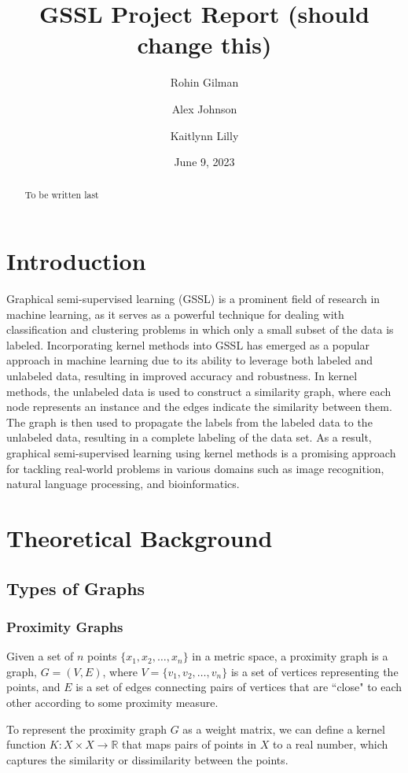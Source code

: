 \documentclass[12pt]{amsart}
\title{GSSL Project Report (should change this)}
\author{Rohin Gilman \and Alex Johnson \and Kaitlynn Lilly}
\date{June 9, 2023}
\begin{document}
\begin{abstract}
	To be written last
\end{abstract}

\maketitle

\section{Introduction} 
Graphical semi-supervised learning (GSSL) is a prominent field of research in machine learning, as it serves as a powerful technique for dealing with classification and clustering problems in which only a small subset of the data is labeled. Incorporating kernel methods into GSSL has emerged as a popular approach in machine learning due to its ability to leverage both labeled and unlabeled data, resulting in improved accuracy and robustness. In kernel methods, the unlabeled data is used to construct a similarity graph, where each node represents an instance and the edges indicate the similarity between them. The graph is then used to propagate the labels from the labeled data to the unlabeled data, resulting in a complete labeling of the data set. As a result, graphical semi-supervised learning using kernel methods is a promising approach for tackling real-world problems in various domains such as image recognition, natural language processing, and bioinformatics.

\section{Theoretical Background}

\subsection{Types of Graphs}
\subsubsection{Proximity Graphs}
Given a set of $n$ points $\{x_1, x_2, \dots, x_n\}$ in a metric space, a proximity graph is a graph, $G = (V, E)$, where $V = \{v_1, v_2, \dots, v_n\}$ is a set of vertices representing the points, and $E$ is a set of edges connecting pairs of vertices that are ``close" to each other according to some proximity measure.

To represent the proximity graph $G$ as a weight matrix, we can define a kernel function $K: X \times X \rightarrow \mathbb{R}$ that maps pairs of points in $X$ to a real number, which captures the similarity or dissimilarity between the points. 
\end{document}
